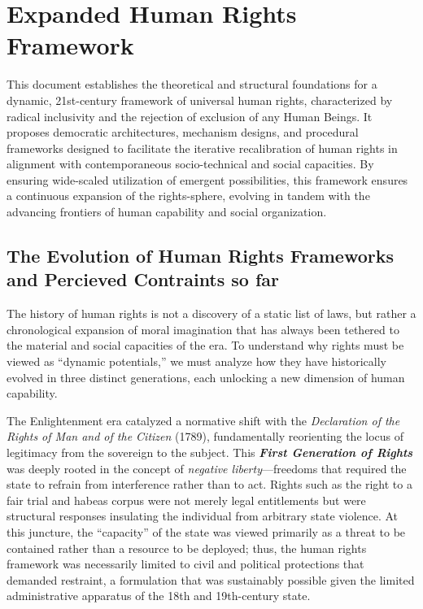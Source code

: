 \section{Expanded Human Rights
Framework}\label{expanded-human-rights-framework}

This document establishes the theoretical and structural foundations for
a dynamic, 21st-century framework of universal human rights,
characterized by radical inclusivity and the rejection of exclusion of
any Human Beings. It proposes democratic architectures, mechanism
designs, and procedural frameworks designed to facilitate the iterative
recalibration of human rights in alignment with contemporaneous
socio-technical and social capacities. By ensuring wide-scaled
utilization of emergent possibilities, this framework ensures a
continuous expansion of the rights-sphere, evolving in tandem with the
advancing frontiers of human capability and social organization.

\subsection{The Evolution of Human Rights Frameworks and Percieved
Contraints so
far}\label{the-evolution-of-human-rights-frameworks-and-percieved-contraints-so-far}

The history of human rights is not a discovery of a static list of laws,
but rather a chronological expansion of moral imagination that has
always been tethered to the material and social capacities of the era.
To understand why rights must be viewed as ``dynamic potentials,'' we
must analyze how they have historically evolved in three distinct
generations, each unlocking a new dimension of human capability.

The Enlightenment era catalyzed a normative shift with the
\emph{Declaration of the Rights of Man and of the Citizen} (1789),
fundamentally reorienting the locus of legitimacy from the sovereign to
the subject. This \textbf{\emph{First Generation of Rights}} was deeply
rooted in the concept of \emph{negative liberty}---freedoms that
required the state to refrain from interference rather than to act.
Rights such as the right to a fair trial and habeas corpus were not
merely legal entitlements but were structural responses insulating the
individual from arbitrary state violence. At this juncture, the
``capacity'' of the state was viewed primarily as a threat to be
contained rather than a resource to be deployed; thus, the human rights
framework was necessarily limited to civil and political protections
that demanded restraint, a formulation that was sustainably possible
given the limited administrative apparatus of the 18th and 19th-century
state.

